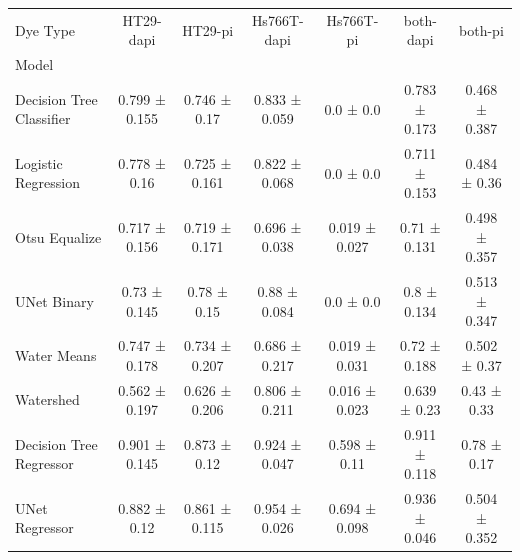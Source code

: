 \begin{tabular}{lcccccc}
\toprule
Dye Type & HT29-dapi & HT29-pi & Hs766T-dapi & Hs766T-pi & both-dapi & both-pi \\
Model &  &  &  &  &  &  \\
\midrule
Decision Tree Classifier & 0.799 ± 0.155 & 0.746 ± 0.17 & 0.833 ± 0.059 & 0.0 ± 0.0 & 0.783 ± 0.173 & 0.468 ± 0.387 \\
Logistic Regression & 0.778 ± 0.16 & 0.725 ± 0.161 & 0.822 ± 0.068 & 0.0 ± 0.0 & 0.711 ± 0.153 & 0.484 ± 0.36 \\
Otsu Equalize & 0.717 ± 0.156 & 0.719 ± 0.171 & 0.696 ± 0.038 & 0.019 ± 0.027 & 0.71 ± 0.131 & 0.498 ± 0.357 \\
UNet Binary & 0.73 ± 0.145 & 0.78 ± 0.15 & 0.88 ± 0.084 & 0.0 ± 0.0 & 0.8 ± 0.134 & 0.513 ± 0.347 \\
Water Means & 0.747 ± 0.178 & 0.734 ± 0.207 & 0.686 ± 0.217 & 0.019 ± 0.031 & 0.72 ± 0.188 & 0.502 ± 0.37 \\
Watershed & 0.562 ± 0.197 & 0.626 ± 0.206 & 0.806 ± 0.211 & 0.016 ± 0.023 & 0.639 ± 0.23 & 0.43 ± 0.33 \\
\midrule
Decision Tree Regressor & 0.901 ± 0.145 & 0.873 ± 0.12 & 0.924 ± 0.047 & 0.598 ± 0.11 & 0.911 ± 0.118 & 0.78 ± 0.17 \\
UNet Regressor & 0.882 ± 0.12 & 0.861 ± 0.115 & 0.954 ± 0.026 & 0.694 ± 0.098 & 0.936 ± 0.046 & 0.504 ± 0.352 \\
\bottomrule
\end{tabular}